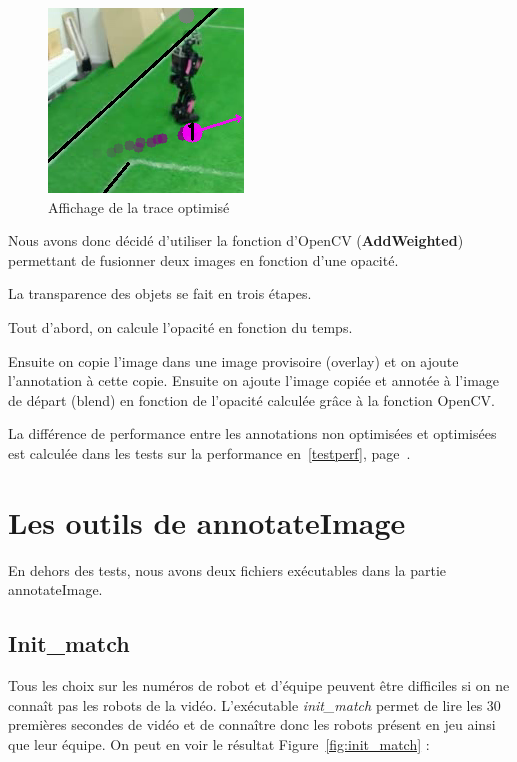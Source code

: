 \begin{figure}[h] 
\centering 
\includegraphics[scale = 0.5]{images/traceoptimized.png}
    \caption{Affichage de la trace optimisé}
    \label{fig:trace_opti}
\end{figure}



Nous avons donc décidé d'utiliser la fonction d'OpenCV
(\textbf{AddWeighted}) permettant de fusionner deux images en
fonction d'une opacité.

\bigskip
\newpage
La transparence des objets se fait en trois étapes.
\bigskip

Tout d'abord, on calcule l'opacité en fonction du temps.
\bigskip

Ensuite on copie l'image dans une image provisoire (overlay) et
on ajoute l'annotation à cette copie. Ensuite on ajoute l'image
copiée et annotée à l'image de départ (blend) en fonction de
l'opacité calculée grâce à la fonction OpenCV. 

\bigskip

La différence de performance entre les annotations non optimisées
et optimisées est calculée dans les tests sur la performance
en~\ref{testperf}, page~\pageref{testperf}.

\section{Les outils de annotateImage}

En dehors des tests, nous avons deux fichiers exécutables dans la
partie annotateImage.

\subsection{Init\_match} \label{init}


Tous les choix sur les numéros de robot et d'équipe peuvent être
difficiles si on ne connaît pas les robots de la vidéo. 
L'exécutable \textit{init\_match} permet de lire les 30 premières
secondes de vidéo et de connaître donc les robots présent en jeu
ainsi que leur équipe. On peut en voir le résultat
Figure~\ref{fig:init_match} :

